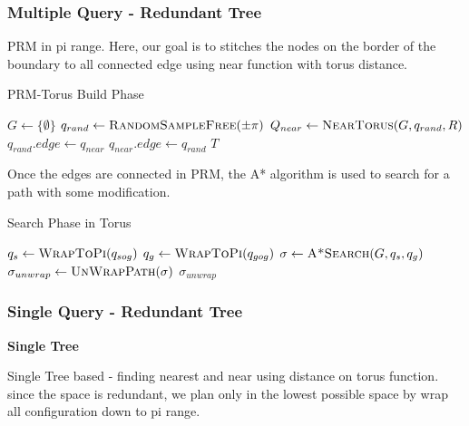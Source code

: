 \subsubsection{Multiple Query - Redundant Tree}
PRM in pi range. Here, our goal is to stitches the nodes on the border of the boundary to all connected edge using near function with torus distance.

\begin{algorithm}[!h]
    \small
    \caption{PRM-Torus Build Phase}

    \begin{algorithmic}
        \State $G \gets \{\emptyset\}$
        \State $q_{rand} \gets \textsc{RandomSampleFree}(\pm \pi)$
        \State $Q_{near} \gets \textsc{NearTorus}(G, q_{rand}, R)$
        \State $q_{rand}.edge \gets q_{near}$
        \State $q_{near}.edge \gets q_{rand}$
        \EndIf
        \EndFor
        \EndFor
        \State \Return $T$
    \end{algorithmic}
\end{algorithm}


Once the edges are connected in PRM, the A* algorithm is used to search for a path with some modification.

\begin{algorithm}[!h]
    \small
    \caption{Search Phase in Torus}

    \begin{algorithmic}
        \State $q_s \gets \textsc{WrapToPi}(q_{sog})$
        \State $q_g \gets \textsc{WrapToPi}(q_{gog})$
        \State $\sigma \gets \textsc{A*Search}(G, q_s, q_g)$
        \State $\sigma_{unwrap} \gets \textsc{UnWrapPath}(\sigma)$
        \EndFunction
        \State \Return $\sigma_{unwrap}$
    \end{algorithmic}
\end{algorithm}



\subsubsection{Single Query - Redundant Tree}


\textbf{Single Tree}


Single Tree based - finding nearest and near using distance on torus function. since the space is redundant, we plan only in the lowest possible space by wrap all configuration down to pi range.

